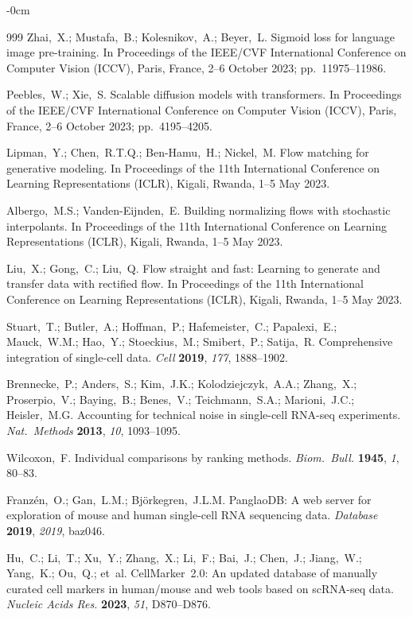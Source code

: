 \documentclass[genes,article,submit,pdftex,oneauthor]{Definitions/mdpi}
\begin{document}
\begin{adjustwidth}{-\extralength}{0cm}
\begin{thebibliography}{999}
Zhai,~X.; Mustafa,~B.; Kolesnikov,~A.; Beyer,~L. Sigmoid loss for language image pre-training. In Proceedings of the IEEE/CVF International Conference on Computer Vision (ICCV), Paris, France, 2--6 October 2023; pp.\ 11975--11986.

Peebles,~W.; Xie,~S. Scalable diffusion models with transformers. In Proceedings of the IEEE/CVF International Conference on Computer Vision (ICCV), Paris, France, 2--6 October 2023; pp.\ 4195--4205.

Lipman,~Y.; Chen,~R.T.Q.; Ben-Hamu,~H.; Nickel,~M. Flow matching for generative modeling. In Proceedings of the 11th International Conference on Learning Representations (ICLR), Kigali, Rwanda, 1--5 May 2023.

Albergo,~M.S.; Vanden-Eijnden,~E. Building normalizing flows with stochastic interpolants. In Proceedings of the 11th International Conference on Learning Representations (ICLR), Kigali, Rwanda, 1--5 May 2023.

Liu,~X.; Gong,~C.; Liu,~Q. Flow straight and fast: Learning to generate and transfer data with rectified flow. In Proceedings of the 11th International Conference on Learning Representations (ICLR), Kigali, Rwanda, 1--5 May 2023.

Stuart,~T.; Butler,~A.; Hoffman,~P.; Hafemeister,~C.; Papalexi,~E.; Mauck,~W.M.; Hao,~Y.; Stoeckius,~M.; Smibert,~P.; Satija,~R. Comprehensive integration of single-cell data. {\em Cell} {\bf 2019}, {\em 177}, 1888--1902.

Brennecke,~P.; Anders,~S.; Kim,~J.K.; Kolodziejczyk,~A.A.; Zhang,~X.; Proserpio,~V.; Baying,~B.; Benes,~V.; Teichmann,~S.A.; Marioni,~J.C.; Heisler,~M.G. Accounting for technical noise in single-cell RNA-seq experiments. {\em Nat.\ Methods} {\bf 2013}, {\em 10}, 1093--1095.

Wilcoxon,~F. Individual comparisons by ranking methods. {\em Biom.\ Bull.} {\bf 1945}, {\em 1}, 80--83.

Franz\'{e}n,~O.; Gan,~L.M.; Bj\"{o}rkegren,~J.L.M. PanglaoDB: A web server for exploration of mouse and human single-cell RNA sequencing data. {\em Database} {\bf 2019}, {\em 2019}, baz046.

Hu,~C.; Li,~T.; Xu,~Y.; Zhang,~X.; Li,~F.; Bai,~J.; Chen,~J.; Jiang,~W.; Yang,~K.; Ou,~Q.; et~al. CellMarker~2.0: An updated database of manually curated cell markers in human/mouse and web tools based on scRNA-seq data. {\em Nucleic Acids Res.} {\bf 2023}, {\em 51}, D870--D876.


\end{thebibliography}
\end{adjustwidth}
\end{document}

